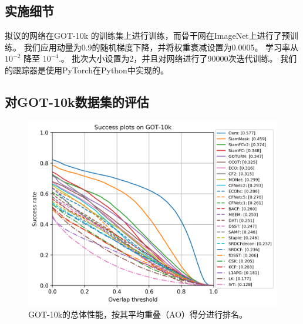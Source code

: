 \subsection{实施细节}
拟议的网络在GOT-10k \cite{GOT-10k} 的训练集上进行训练，而骨干网在ImageNet上进行了预训练。
我们应用动量​​为0.9的随机梯度下降，并将权重衰减设置为0.0005。
学习率从 $10^{-2}$ 降至 $10^{-4}$.。
批次大小设置为2，并且对网络进行了90000次迭代训练。
我们的跟踪器是使用PyTorch在Python中实现的。
\subsection{对GOT-10k数据集的评估}

\begin{figure}[t]
    \centering
    \includegraphics[width=1\textwidth]{Img/end/success_plot.png}
    \caption{GOT-10k的总体性能，按其平均重叠（AO）得分进行排名。}
    \label{fig:got10k}
\end{figure}

